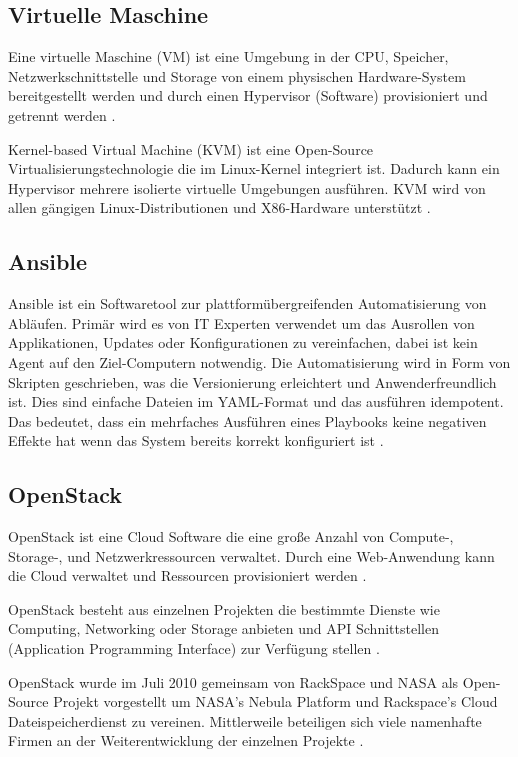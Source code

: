 \documentclass[../Main.tex]{subfiles}
\begin{document}
\subsection{Virtuelle Maschine}

Eine virtuelle Maschine (VM) ist eine Umgebung in der CPU, Speicher, Netzwerkschnittstelle und Storage von einem physischen
Hardware-System bereitgestellt werden und durch einen Hypervisor (Software) provisioniert und getrennt werden \citep{VirtuelleMaschine}.

Kernel-based Virtual Machine (KVM) ist eine Open-Source Virtualisierungstechnologie die im Linux-Kernel integriert ist. Dadurch kann ein Hypervisor mehrere isolierte
virtuelle Umgebungen ausführen. KVM wird von allen gängigen Linux-Distributionen und X86-Hardware unterstützt \citep{KVM}.

\subsection{Ansible}

Ansible ist ein Softwaretool zur plattformübergreifenden Automatisierung von Abläufen.
Primär wird es von IT Experten verwendet um das Ausrollen von Applikationen, Updates oder Konfigurationen zu vereinfachen, dabei ist
kein Agent auf den Ziel-Computern notwendig.
Die Automatisierung wird in Form von Skripten geschrieben, was die Versionierung erleichtert und Anwenderfreundlich ist. Dies sind einfache Dateien im YAML-Format und das ausführen idempotent.
Das bedeutet, dass ein mehrfaches Ausführen eines Playbooks keine negativen Effekte hat wenn das System bereits korrekt konfiguriert ist \citep{Ansible}.

\subsection{OpenStack}

OpenStack ist eine Cloud Software die eine gro{\ss}e Anzahl von Compute-, Storage-, und Netzwerkressourcen
verwaltet. Durch eine Web-Anwendung kann die Cloud verwaltet und Ressourcen provisioniert werden \citep{OpenStack}.

OpenStack besteht aus einzelnen Projekten die bestimmte Dienste wie Computing, Networking oder Storage anbieten und
API Schnittstellen (Application Programming Interface) zur Verfügung stellen \citep{OpenstackComponents}.

OpenStack wurde im Juli 2010 gemeinsam von RackSpace und NASA als Open-Source Projekt vorgestellt um NASA's Nebula Platform und Rackspace's Cloud Dateispeicherdienst zu vereinen. Mittlerweile beteiligen sich viele
namenhafte Firmen an der Weiterentwicklung der einzelnen Projekte \citep{WhatIsOpenStack}.
\end{document}
